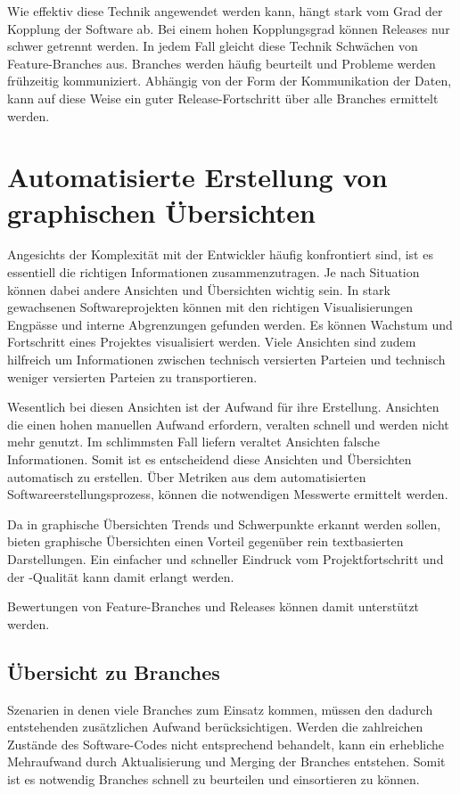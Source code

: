 Wie effektiv diese Technik angewendet werden kann, hängt stark vom Grad der Kopplung der Software ab. Bei einem hohen Kopplungsgrad können Releases nur schwer getrennt werden. In jedem Fall gleicht diese Technik Schwächen von Feature-Branches aus. Branches werden häufig beurteilt und Probleme werden frühzeitig kommuniziert. Abhängig von der Form der Kommunikation der Daten, kann auf diese Weise ein guter Release-Fortschritt über alle Branches ermittelt werden. 

\section{Automatisierte Erstellung von graphischen Übersichten}

Angesichts der Komplexität mit der Entwickler häufig konfrontiert sind, ist es essentiell die richtigen Informationen zusammenzutragen. Je nach Situation können dabei andere Ansichten und Übersichten wichtig sein. In stark gewachsenen Softwareprojekten können mit den richtigen Visualisierungen Engpässe und interne Abgrenzungen gefunden werden. Es können Wachstum und Fortschritt eines Projektes visualisiert werden. Viele Ansichten sind zudem hilfreich um Informationen zwischen technisch versierten Parteien und technisch weniger versierten Parteien zu transportieren.

Wesentlich bei diesen Ansichten ist der Aufwand für ihre Erstellung. Ansichten die einen hohen manuellen Aufwand erfordern, veralten schnell und werden nicht mehr genutzt. Im schlimmsten Fall liefern veraltet Ansichten falsche Informationen. Somit ist es entscheidend diese Ansichten und Übersichten automatisch zu erstellen. Über Metriken aus dem automatisierten Softwareerstellungsprozess, können die notwendigen Messwerte ermittelt werden. 

Da in graphische Übersichten Trends und Schwerpunkte erkannt werden sollen, bieten graphische Übersichten einen Vorteil gegenüber rein textbasierten Darstellungen. Ein einfacher und schneller Eindruck vom Projektfortschritt und der -Qualität kann damit erlangt werden.

Bewertungen von Feature-Branches und Releases können damit unterstützt werden.

\subsection{Übersicht zu Branches}

Szenarien in denen viele Branches zum Einsatz kommen, müssen den dadurch entstehenden zusätzlichen Aufwand berücksichtigen. Werden die zahlreichen Zustände des Software-Codes nicht entsprechend behandelt, kann ein erhebliche Mehraufwand durch Aktualisierung und Merging der Branches entstehen. Somit ist es notwendig Branches schnell zu beurteilen und einsortieren zu können.

